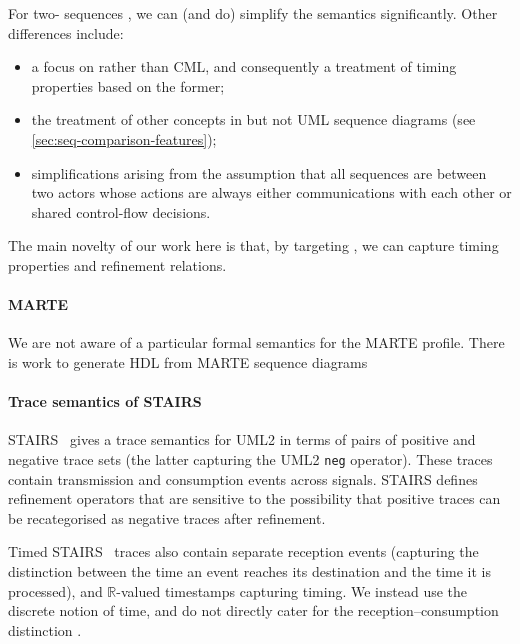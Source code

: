 For two-\mactor{} sequences , we can (and do)
simplify the semantics significantly.  Other differences include:

\begin{itemize}
\item a focus on \tockcsp{} rather than CML, and consequently a
  treatment of timing properties based on the former;
\item
  the treatment of other concepts in \langname{} but not UML sequence
  diagrams (see \cref{sec:seq-comparison-features});
\item simplifications arising from the assumption that all sequences
  are between two actors whose actions are always either communications with
  each other or shared control-flow decisions.
\end{itemize}

The main novelty of our work here is that, by targeting \tockcsp, we can capture
timing properties and refinement relations.

\paragraph{MARTE}

We are not aware of a particular formal semantics for the MARTE profile.
There is work to generate HDL from MARTE sequence diagrams~

\paragraph{Trace semantics of STAIRS}

STAIRS~\cite{Haugen03-STAIRS} gives a trace semantics for UML2 in terms
of pairs of positive and negative trace sets (the latter capturing the UML2
\texttt{neg} operator).  These traces contain
transmission and consumption events across signals.  STAIRS defines
refinement operators that are sensitive to the possibility that positive
traces can be recategorised as negative traces after refinement.

Timed
STAIRS~\cite{Haugen05-TimedSTAIRS} traces also contain separate reception
events (capturing the distinction between the time an event reaches
its destination and the time it is processed), and \(\mathbb R\)-valued
timestamps capturing timing.  We instead use the discrete \tockcsp{} notion
of time, and do not directly cater for the reception--consumption distinction
.

